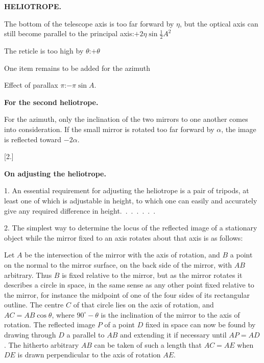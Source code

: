 \clearpage
\noindent\null\hfill{\small\textbf{HELIOTROPE.}}\hfill{}\par\medskip
\begin{list}{}{\setlength{\leftmargin}{9mm}\setlength{\labelwidth}{6mm}\setlength{\itemsep}{2pt}\setlength{\parsep}{0pt}\setlength{\topsep}{0pt}}
\item[7.] The bottom of the telescope axis is too far forward by $\eta$,
but the optical axis can still become parallel to the
principal axis:\hfill $+2\eta\sin\frac12 A^2$
\item[8.] The reticle is too high by $\theta$:\hfill $+\theta$
\end{list}
\noindent One item remains to be added for the azimuth\par
\hspace*{9mm}Effect of parallax $\pi$:\hfill $-\pi\sin A.$
\begin{center}\textbf{For the second heliotrope.}\end{center}
For the azimuth, only the inclination of the two mirrors to one another
comes into consideration. If the small mirror is rotated too far forward by
$\alpha$, the image is reflected toward $-2\alpha$.
\begin{center}
[2.]\par\medskip
\textbf{On adjusting the heliotrope.}
\end{center}
1. An essential requirement for adjusting the heliotrope is a pair of
tripods, at least one of which is adjustable in height, to which one can
easily and accurately give any required difference in height.\ .\ .\ .\ .\ .\ .

2. The simplest way to determine the locus of the reflected image of a
stationary object while the mirror fixed to an axis rotates about that axis
is as follows:

Let $A$ be the intersection of the mirror  with the axis of rotation,
and $B$ a point on the normal to the mirror surface, on the back side of
the mirror, with $AB$ arbitrary. Thus $B$ is fixed relative to the mirror,
but as the mirror rotates it describes a circle in space, in the same sense
as any other point fixed relative to the mirror, for instance the midpoint
of one of the four sides of its rectangular outline. The centre $C$ of that circle lies
on the axis of rotation, and $AC=AB\cos\theta$, where $90^\circ-\theta$ is
the inclination of the mirror to the axis of rotation. The reflected image
$P$ of a point $D$ fixed in space can now be found by drawing through $D$ a
parallel to $AB$ and extending it if necessary until $AP=AD$. The hitherto
arbitrary $AB$ can be taken of such a length that $AC=AE$ when $DE$ is drawn
perpendicular to the axis of rotation $AE$.

